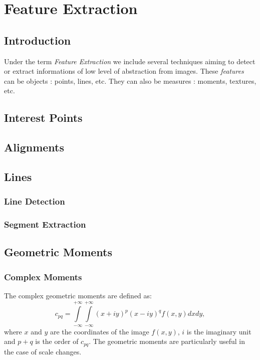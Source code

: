 \chapter{Feature Extraction}
\section{Introduction}
Under the term {\em Feature Extraction} we include several techniques
aiming to detect or extract informations of low level of abstraction
from images. These {\em features} can be objects : points, lines,
etc. They can also be measures : moments, textures, etc.


\section{Interest Points}

\section{Alignments}
\label{sec:Alignments}

\section{Lines}
\label{sec:LineDetectors}

\subsection{Line Detection}
\label{sec:LineDetection}




\subsection{Segment Extraction}
\label{sec:SegmentExtraction}

%
%

\section{Geometric Moments}

\subsection{Complex Moments}
\label{sec:ComplexMoments}
The complex geometric moments are defined as:
\begin {equation}
c_{pq} = \int\limits_{-\infty}^{+\infty}\int\limits_{-\infty}^{+\infty}(x + iy)^p(x- iy)^qf(x,y)dxdy,
\label{2.2}
\end{equation}
where $x$ and $y$ are the coordinates of the image $f(x,y)$, $i$ is the
imaginary unit and
$p+q$ is the order of $c_{pq}$. The geometric moments are
particularly useful in the case of scale changes.

